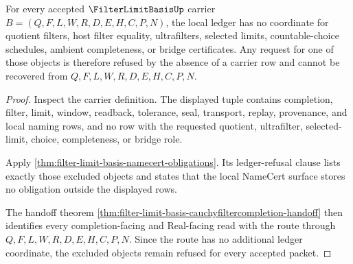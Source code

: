 \begin{theorem}
\label{thm:filter-limit-basis-ledger-refusal}
For every accepted $\FilterLimitBasisUp$ carrier $B=(Q,F,L,W,R,D,E,H,C,P,N)$, the local ledger has no coordinate for quotient filters, host filter equality, ultrafilters, selected limits, countable-choice schedules, ambient completeness, or bridge certificates. Any request for one of those objects is therefore refused by the absence of a carrier row and cannot be recovered from $Q,F,L,W,R,D,E,H,C,P,N$.
\end{theorem}
\begin{proof}
Inspect the carrier definition. The displayed tuple contains completion, filter, limit, window, readback, tolerance, seal, transport, replay, provenance, and local naming rows, and no row with the requested quotient, ultrafilter, selected-limit, choice, completeness, or bridge role.

Apply \autoref{thm:filter-limit-basis-namecert-obligations}. Its ledger-refusal clause lists exactly those excluded objects and states that the local NameCert surface stores no obligation outside the displayed rows.

The handoff theorem \autoref{thm:filter-limit-basis-cauchyfiltercompletion-handoff} then identifies every completion-facing and Real-facing read with the route through $Q,F,L,W,R,D,E,H,C,P,N$. Since the route has no additional ledger coordinate, the excluded objects remain refused for every accepted packet.
\end{proof}

